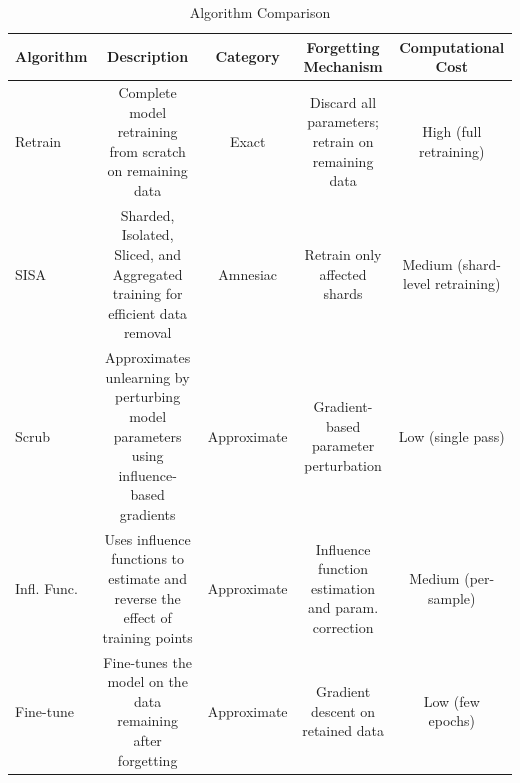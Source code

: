 \begin{table}[t]
\centering
\caption{Algorithm Comparison}
\label{tab:algorithm_comparison}
\small
\begin{tabular}{lcccc}
\toprule
Algorithm & Description & Category & Forgetting Mechanism & Computational Cost \\
\midrule
Retrain & Complete model retraining from scratch on remaining data & Exact & Discard all parameters; retrain on remaining data & High (full retraining) \\
SISA & Sharded, Isolated, Sliced, and Aggregated training for efficient data removal & Amnesiac & Retrain only affected shards & Medium (shard-level retraining) \\
Scrub & Approximates unlearning by perturbing model parameters using influence-based gradients & Approximate & Gradient-based parameter perturbation & Low (single pass) \\
Infl. Func. & Uses influence functions to estimate and reverse the effect of training points & Approximate & Influence function estimation and param. correction & Medium (per-sample) \\
Fine-tune & Fine-tunes the model on the data remaining after forgetting & Approximate & Gradient descent on retained data & Low (few epochs) \\
\bottomrule
\end{tabular}
\end{table}
